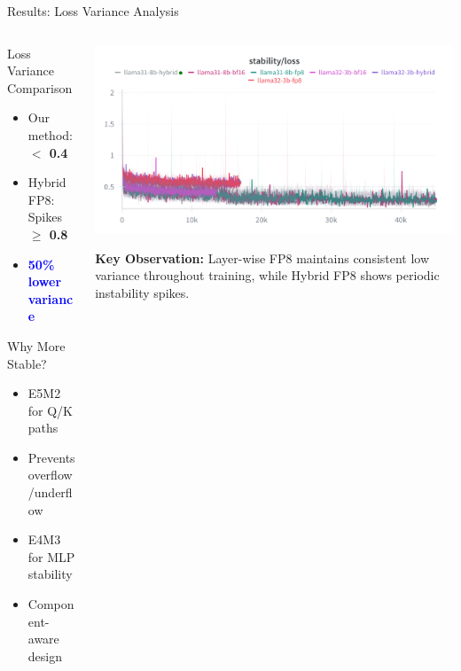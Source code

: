 \begin{frame}{Results: Loss Variance Analysis}

\begin{columns}[c]
\begin{column}{0.48\textwidth}
    \begin{block}{Loss Variance Comparison}
    \begin{itemize}
        \item Our method: \textbf{$<$ 0.4}
        \item Hybrid FP8: Spikes \textbf{$\geq$ 0.8}
        \item \textcolor{blue}{\textbf{50\% lower variance}}
    \end{itemize}
    \end{block}

    \vspace{0.3cm}

    \begin{alertblock}{Why More Stable?}
    \begin{itemize}
        \item E5M2 for Q/K paths
        \item Prevents overflow/underflow
        \item E4M3 for MLP stability
        \item Component-aware design
    \end{itemize}
    \end{alertblock}
\end{column}

\begin{column}{0.50\textwidth}
    \centering
    \includegraphics[width=\textwidth]{figures/numeric_stability.png}

    \vspace{0.3cm}

    \small
    \textbf{Key Observation:} Layer-wise FP8 maintains consistent low variance throughout training, while Hybrid FP8 shows periodic instability spikes.
\end{column}
\end{columns}

\end{frame}
